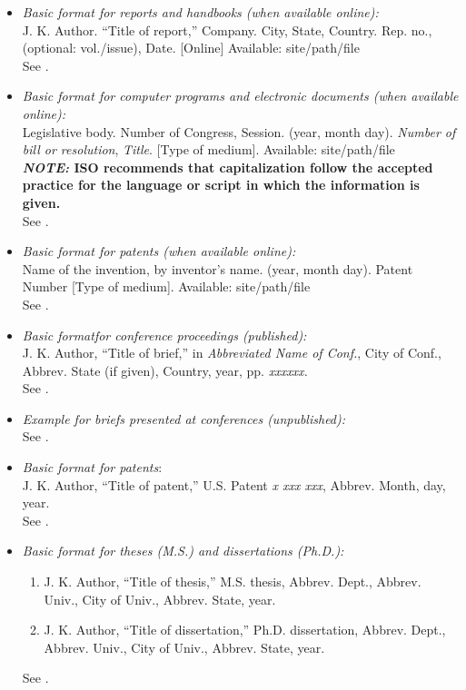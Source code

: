 \documentclass{IEEEtran}
\begin{document}
\begin{itemize}
\item \emph{Basic format for reports and handbooks (when available online):}\\
J. K. Author. ``Title of report,'' Company. City, State, Country. Rep. no., (optional: vol./issue), Date. [Online] Available: site/path/file\\
See \cite{b18,b19}.

\item \emph{Basic format for computer programs and electronic documents (when available online): }\\
Legislative body. Number of Congress, Session. (year, month day). \emph{Number of bill or resolution}, \emph{Title}. [Type of medium]. Available: site/path/file\\
\textbf{\emph{NOTE: }ISO recommends that capitalization follow the accepted practice for the language or script in which the information is given.}\\
See \cite{b20}.

\item \emph{Basic format for patents (when available online):}\\
Name of the invention, by inventor's name. (year, month day). Patent Number [Type of medium]. Available: site/path/file\\
See \cite{b21}.

\item \emph{Basic format}\emph{for conference proceedings (published):}\\
J. K. Author, ``Title of brief,'' in \emph{Abbreviated Name of Conf.}, City of Conf., Abbrev. State (if given), Country, year, pp. \emph{xxxxxx.}\\
See \cite{b22}.

\item \emph{Example for briefs presented at conferences (unpublished):}\\
See \cite{b23}.

\item \emph{Basic format for patents}$:$\\
J. K. Author, ``Title of patent,'' U.S. Patent \emph{x xxx xxx}, Abbrev. Month, day, year.\\
See \cite{b24}.

\item \emph{Basic format for theses (M.S.) and dissertations (Ph.D.):}
\begin{enumerate}
\item J. K. Author, ``Title of thesis,'' M.S. thesis, Abbrev. Dept., Abbrev. Univ., City of Univ., Abbrev. State, year.
\item J. K. Author, ``Title of dissertation,'' Ph.D. dissertation, Abbrev. Dept., Abbrev. Univ., City of Univ., Abbrev. State, year.
\end{enumerate}
See \cite{b25,b26}.


\end{itemize}
\end{document}
